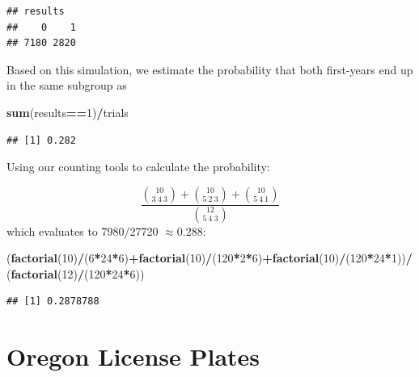 \documentclass[
]{book}
\newenvironment{Shaded}{\begin{snugshade}}{\end{snugshade}}
\newcommand{\DecValTok}[1]{\textcolor[rgb]{0.00,0.00,0.81}{#1}}
\newcommand{\FunctionTok}[1]{\textcolor[rgb]{0.13,0.29,0.53}{\textbf{#1}}}
\newcommand{\NormalTok}[1]{#1}
\newcommand{\SpecialCharTok}[1]{\textcolor[rgb]{0.81,0.36,0.00}{\textbf{#1}}}
\theoremstyle{definition}
\theoremstyle{definition}
\theoremstyle{definition}
\theoremstyle{definition}
\theoremstyle{remark}
\begin{document}
\begin{verbatim}
## results
##    0    1 
## 7180 2820
\end{verbatim}

Based on this simulation, we estimate the probability that both first-years end up in the same subgroup as

\begin{Shaded}
\begin{Highlighting}[]
\FunctionTok{sum}\NormalTok{(results}\SpecialCharTok{==}\DecValTok{1}\NormalTok{)}\SpecialCharTok{/}\NormalTok{trials}
\end{Highlighting}
\end{Shaded}

\begin{verbatim}
## [1] 0.282
\end{verbatim}

Using our counting tools to calculate the probability:

\[\frac{\binom{10}{3~4~3}+\binom{10}{5~2~3}+\binom{10}{5~4~1}}{\binom{12}{5~4~3}}\]
which evaluates to 7980/27720 \(\approx 0.288\):

\begin{Shaded}
\begin{Highlighting}[]
\NormalTok{(}\FunctionTok{factorial}\NormalTok{(}\DecValTok{10}\NormalTok{)}\SpecialCharTok{/}\NormalTok{(}\DecValTok{6}\SpecialCharTok{*}\DecValTok{24}\SpecialCharTok{*}\DecValTok{6}\NormalTok{)}\SpecialCharTok{+}\FunctionTok{factorial}\NormalTok{(}\DecValTok{10}\NormalTok{)}\SpecialCharTok{/}\NormalTok{(}\DecValTok{120}\SpecialCharTok{*}\DecValTok{2}\SpecialCharTok{*}\DecValTok{6}\NormalTok{)}\SpecialCharTok{+}\FunctionTok{factorial}\NormalTok{(}\DecValTok{10}\NormalTok{)}\SpecialCharTok{/}\NormalTok{(}\DecValTok{120}\SpecialCharTok{*}\DecValTok{24}\SpecialCharTok{*}\DecValTok{1}\NormalTok{))}\SpecialCharTok{/}\NormalTok{(}\FunctionTok{factorial}\NormalTok{(}\DecValTok{12}\NormalTok{)}\SpecialCharTok{/}\NormalTok{(}\DecValTok{120}\SpecialCharTok{*}\DecValTok{24}\SpecialCharTok{*}\DecValTok{6}\NormalTok{))}
\end{Highlighting}
\end{Shaded}

\begin{verbatim}
## [1] 0.2878788
\end{verbatim}

\section{Oregon License Plates}\label{license-plates-R}
\end{document}
